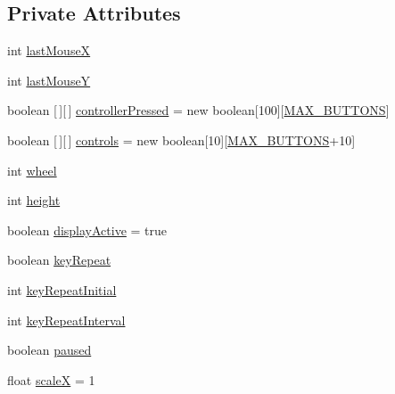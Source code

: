 \subsection*{Private Attributes}
\begin{DoxyCompactItemize}
\item 
int \mbox{\hyperlink{classorg_1_1newdawn_1_1slick_1_1_input_af21796aa14b2b0b5f799c2fa38b3c1ee}{last\+MouseX}}
\item 
int \mbox{\hyperlink{classorg_1_1newdawn_1_1slick_1_1_input_ae2b5953abef8e76cadf0d6004c323b20}{last\+MouseY}}
\item 
boolean \mbox{[}$\,$\mbox{]}\mbox{[}$\,$\mbox{]} \mbox{\hyperlink{classorg_1_1newdawn_1_1slick_1_1_input_a388a6d0a6069e1344ed26102b5d54c86}{controller\+Pressed}} = new boolean\mbox{[}100\mbox{]}\mbox{[}\mbox{\hyperlink{classorg_1_1newdawn_1_1slick_1_1_input_a2c2eabdc1cc7e21483aed750421861b1}{M\+A\+X\+\_\+\+B\+U\+T\+T\+O\+NS}}\mbox{]}
\item 
boolean \mbox{[}$\,$\mbox{]}\mbox{[}$\,$\mbox{]} \mbox{\hyperlink{classorg_1_1newdawn_1_1slick_1_1_input_a6d736e3b8301642cdd24f20283cf059f}{controls}} = new boolean\mbox{[}10\mbox{]}\mbox{[}\mbox{\hyperlink{classorg_1_1newdawn_1_1slick_1_1_input_a2c2eabdc1cc7e21483aed750421861b1}{M\+A\+X\+\_\+\+B\+U\+T\+T\+O\+NS}}+10\mbox{]}
\item 
int \mbox{\hyperlink{classorg_1_1newdawn_1_1slick_1_1_input_aad1c93f95c8592e2a5414f852d4fdf99}{wheel}}
\item 
int \mbox{\hyperlink{classorg_1_1newdawn_1_1slick_1_1_input_a7d805ec6ad6944a4c48189e8435c3589}{height}}
\item 
boolean \mbox{\hyperlink{classorg_1_1newdawn_1_1slick_1_1_input_a2bca09cd95bf97dace22ffc219cf08a9}{display\+Active}} = true
\item 
boolean \mbox{\hyperlink{classorg_1_1newdawn_1_1slick_1_1_input_aea0230af228833c26285808ad0ee2ae0}{key\+Repeat}}
\item 
int \mbox{\hyperlink{classorg_1_1newdawn_1_1slick_1_1_input_ac9f01a457c37395ee09f9da787671bf9}{key\+Repeat\+Initial}}
\item 
int \mbox{\hyperlink{classorg_1_1newdawn_1_1slick_1_1_input_a860b844c1812fda53979e3bd9f558a98}{key\+Repeat\+Interval}}
\item 
boolean \mbox{\hyperlink{classorg_1_1newdawn_1_1slick_1_1_input_aaf9066433bbf1f7a1fc5738405412a32}{paused}}
\item 
float \mbox{\hyperlink{classorg_1_1newdawn_1_1slick_1_1_input_ad007c0ee133e9e1ca57f2ae95c7df166}{scaleX}} = 1

\end{DoxyCompactItemize}
